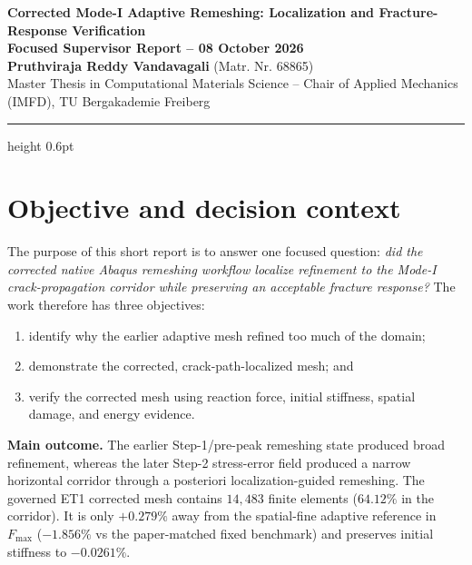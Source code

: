 \documentclass[10pt,a4paper]{article}
\newcommand{\evidencebox}[2]{%
  \begin{tcolorbox}[colback=#1!5!white,colframe=#1!70!black,boxrule=0.45pt,
    arc=1pt,left=5pt,right=5pt,top=3pt,bottom=3pt,before skip=4pt,after skip=4pt]
    \small #2
  \end{tcolorbox}}
\begin{document}
\begin{center}
  {\Large\textbf{Corrected Mode-I Adaptive Remeshing: Localization and Fracture-Response Verification}}\\[0.30em]
  {\large\textbf{Focused Supervisor Report -- 08 October 2026}}\\[0.25em]
  {\normalsize\textbf{Pruthviraja Reddy Vandavagali} (Matr. Nr. 68865)}\\[0.10em]
  {\footnotesize Master Thesis in Computational Materials Science -- Chair of Applied Mechanics (IMFD), TU Bergakademie Freiberg}
\end{center}
\vspace{-0.3em}
\hrule height 0.6pt

\section{Objective and decision context}

The purpose of this short report is to answer one focused question: \emph{did the corrected native Abaqus remeshing workflow localize refinement to the Mode-I crack-propagation corridor while preserving an acceptable fracture response?} The work therefore has three objectives:

\begin{enumerate}
  \item identify why the earlier adaptive mesh refined too much of the domain;
  \item demonstrate the corrected, crack-path-localized mesh; and
  \item verify the corrected mesh using reaction force, initial stiffness, spatial damage, and energy evidence.
\end{enumerate}

\evidencebox{reportgreen}{\textbf{Main outcome.} The earlier Step-1/pre-peak remeshing state produced broad refinement, whereas the later Step-2 stress-error field produced a narrow horizontal corridor through a posteriori localization-guided remeshing. The governed ET1 corrected mesh contains $14{,}483$ finite elements ($64.12\%$ in the corridor). It is only $+0.279\%$ away from the spatial-fine adaptive reference in $F_{\max}$ ($-1.856\%$ vs the paper-matched fixed benchmark) and preserves initial stiffness to $-0.0261\%$.}
\end{document}
